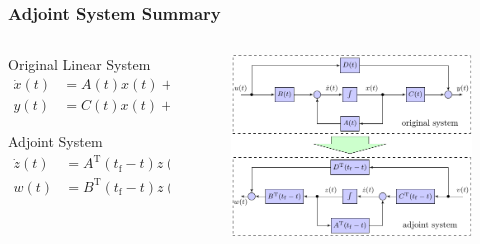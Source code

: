 \documentclass[12pt,xcolor={table},aspectratio=169]{beamer}
\begin{document}
\begin{frame}
    \frametitle{Adjoint System Summary}
        \vspace{-2em}
    \begin{columns}
    \begin{column}[c]{0.4\paperwidth}
  \begin{block}{Original Linear System}
  {\setlength\abovedisplayskip{1pt}
  \setlength\belowdisplayskip{1pt}
\begin{equation*}
\left .
 \begin{aligned}
        \dot{x}(t) &= A(t)x(t)+B(t)u(t), \\
        y(t) & = C(t)x(t)+D(t)u(t)
 \end{aligned} \right \}
\end{equation*}
   }%
  \end{block}
    \begin{block}{Adjoint System}
  {\setlength\abovedisplayskip{1pt}
  \setlength\belowdisplayskip{1pt}
\begin{equation*}
\left .
  \begin{aligned}
        \dot{z}(t) &= A^{\mathrm{T}}(t_{\mathrm{f}}-t)z(t)+C^{\mathrm{T}}(t_{\mathrm{f}}-t)v(t),  \\
        w(t) & = B^{\mathrm{T}}(t_{\mathrm{f}}-t)z(t)+D^{\mathrm{T}}(t_{\mathrm{f}}-t)v(t)
 \end{aligned} \right \}
\end{equation*}
  }%
  \end{block}
  \end{column}
      \begin{column}[c]{0.4\paperwidth}
      \vspace{0.5em}
        \begin{minipage}[c][0.6\textheight][c]{\linewidth}
    \centering
\begin{figure}
    \centering
\includegraphics[scale=0.6]{image/adjCnstr}

\end{figure}
\end{minipage}
\end{column}
\end{columns}
\end{frame}
\end{document}
